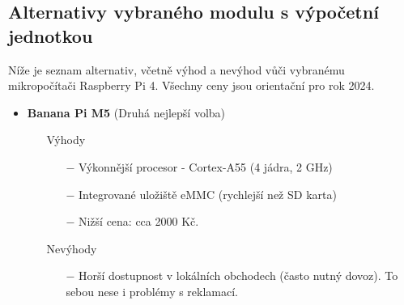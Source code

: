 \subsection{Alternativy vybraného modulu s výpočetní jednotkou}
Níže je seznam alternativ, včetně výhod a nevýhod vůči vybranému mikropočítači Raspberry Pi 4. Všechny ceny jsou orientační pro rok 2024.


\begin{itemize}
    \item \textbf{Banana Pi M5} (Druhá nejlepší volba)
        \begin{itemize}
        \item[] Výhody
            \begin{itemize}
                \item[$-$] Výkonnější procesor - Cortex-A55 (4 jádra, 2 GHz)
                \item[$-$] Integrované uložiště eMMC (rychlejší než SD karta)
                \item[$-$] Nižší cena: cca 2000 Kč.
            \end{itemize}
        \item[] Nevýhody
            \begin{itemize}
                \item[$-$] Horší dostupnost v lokálních obchodech (často nutný dovoz). To sebou nese i problémy s reklamací.

\end{itemize}
\end{itemize}
\end{itemize}
